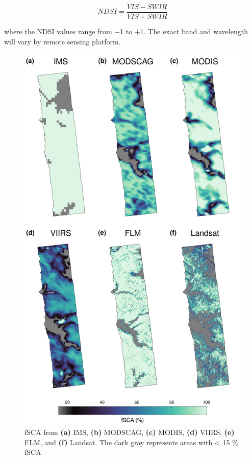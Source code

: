 \begin{equation}
\label{eq:ndsi}
NDSI = \frac{VIS - SWIR}{VIS + SWIR}
\end{equation}

\noindent where the NDSI values range from $-$1 to $+$1. The exact band and wavelength will vary by remote sensing platform. 

\begin{figure}[h]
\includegraphics[width=\textwidth]{figures/ch4_figs/fsca_usvar_v2.pdf}
\caption{fSCA from \textbf{(a)} IMS, \textbf{(b)} MODSCAG, \textbf{(c)} MODIS, \textbf{(d)} VIIRS, \textbf{(e)} FLM, and \textbf{(f)} Landsat. The dark gray represents areas with < 15 \% fSCA}
\end{figure}

